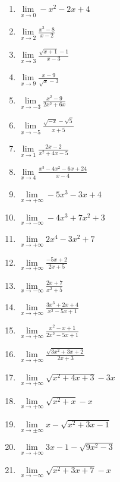 \documentclass[12pt,a4paper]{article}
\begin{document}
\begin{multicols}{3}
\setlength{\columnseprule}{0.1mm} %
\begin{enumerate}[align=left]
    \item $\displaystyle \lim\limits_{x \to 0} -x^2 - 2x + 4$
    \item $\displaystyle \lim\limits_{x \to 2} \frac{x^3 - 8}{x - 2}$
    \item $\displaystyle \lim\limits_{x \to 3} \frac{\sqrt{x + 1} - 1}{x - 3}$
    \item $\displaystyle \lim\limits_{x \to 9} \frac{x - 9}{\sqrt{x} - 3}$
    \item  $\displaystyle \lim\limits_{x \to -3} \frac{x^{2} - 9}{2x^{2} + 6x}$
    \item $\displaystyle \lim\limits_{x \to -5} \frac{\sqrt{-x} - \sqrt{5}}{x + 5}$
    \item $\displaystyle \lim\limits_{x \to 1} \frac{2x - 2}{x^2 + 4x - 5}$
    \item $\displaystyle \lim\limits_{x \to 4} \frac{x^3 - 4x^2 - 6x + 24}{x - 4}$
    \item $\displaystyle \lim\limits_{x \to +\infty} -5x^3 - 3x + 4$
    \item $\displaystyle \lim\limits_{x \to -\infty} -4x^3 + 7x^2 + 3$
    \item $\displaystyle \lim\limits_{x \to +\infty} 2x^4 - 3x^2 + 7$
    \item $\displaystyle \lim\limits_{x \to +\infty} \frac{-5x + 2}{2x + 5}$
    \item $\displaystyle \lim\limits_{x \to -\infty} \frac{2x + 7}{x^2 + 5}$
    \item $\displaystyle \lim\limits_{x \to +\infty} \frac{3x^3 + 2x + 4}{x^2 - 5x + 1}$
    \item $\displaystyle \lim\limits_{x \to +\infty} \frac{x^2 - x + 1}{2x^2 - 5x + 1}$
    \item $\displaystyle \lim\limits_{x \to +\infty} \frac{\sqrt{3x^2 + 3x + 2}}{2x + 3}$
    \item $\displaystyle \lim\limits_{x \to +\infty} \sqrt{x^2 + 4x + 3} - 3x$
    \item $\displaystyle \lim\limits_{x \to +\infty} \sqrt{x^2 + x} - x$
    \item $\displaystyle \lim\limits_{x \to \pm\infty} x - \sqrt{x^2 + 3x - 1}$
    \item $\displaystyle \lim\limits_{x \to +\infty} 3x - 1 - \sqrt{9x^2 - 3}$
    \item $\displaystyle \lim\limits_{x \to -\infty} \sqrt{x^2 + 3x + 7} - x$

\end{enumerate}
\end{multicols}
\end{document}

